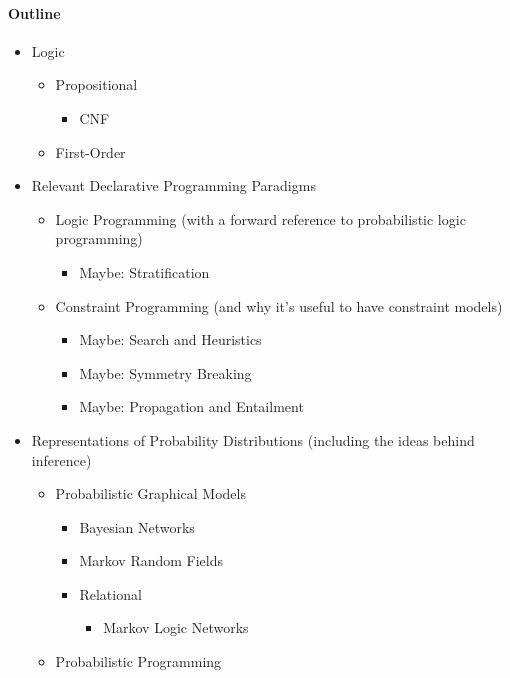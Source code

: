 \paragraph{Outline}
\begin{itemize}
\item Logic
  \begin{itemize}
  \item Propositional
    \begin{itemize}
    \item CNF
    \end{itemize}
  \item First-Order
  \end{itemize}
\item Relevant Declarative Programming Paradigms
  \begin{itemize}
  \item Logic Programming (with a forward reference to probabilistic logic programming)
    \begin{itemize}
    \item Maybe: Stratification
    \end{itemize}
  \item Constraint Programming (and why it's useful to have constraint models)
    \begin{itemize}
    \item Maybe: Search and Heuristics
    \item Maybe: Symmetry Breaking
    \item Maybe: Propagation and Entailment
    \end{itemize}
  \end{itemize}
\item Representations of Probability Distributions (including the ideas behind inference)
  \begin{itemize}
  \item Probabilistic Graphical Models
    \begin{itemize}
    \item Bayesian Networks
    \item Markov Random Fields
    \item Relational
      \begin{itemize}
      \item Markov Logic Networks
      \end{itemize}
    \end{itemize}
  \item Probabilistic Programming
    \begin{itemize}

\end{itemize}
\end{itemize}
\end{itemize}
